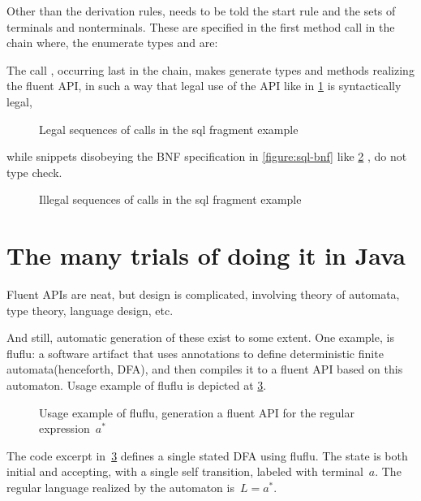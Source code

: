 Other than the derivation rules, \Fajita needs to be told the start rule
  and the sets of terminals and nonterminals.
These are specified in the first method call in the chain where,
  the enumerate types  and  are:

\begin{quote}
\end{quote}

The call , occurring last in the chain, makes \Fajita generate types
and methods realizing the fluent API, in such a way that legal use of the API
like in \cref{figure:sql:legal} is syntactically legal,

\begin{figure}[H]
  \caption{\label{figure:sql:legal}
  Legal sequences of calls in the sql fragment example}

\end{figure}

while snippets disobeying the BNF specification in \cref{figure:sql-bnf} like
\cref{figure:sql:illegal} , do not type check.

\begin{figure}[H]
  \caption{\label{figure:sql:illegal}
  Illegal sequences of calls in the sql fragment example}
\end{figure}

\section{The many trials of doing it in Java}
Fluent APIs are neat, but design is complicated,
involving theory of automata, type theory, language design, etc.

And still, automatic generation of these exist to some extent.
One example, is fluflu: a software artifact that uses
\Java annotations to define deterministic finite automata(henceforth, DFA), and then
compiles it to a fluent API based on this automaton. Usage example of fluflu is
depicted at \cref{figure:fluflu}.

\begin{figure}[ht]
  \caption{\label{figure:fluflu}
    Usage example of fluflu, generation a fluent
  API for the regular expression~\texorpdfstring{$a^*$}{a*}}
\end{figure}
The code excerpt in~\cref{figure:fluflu} defines a single stated DFA using
fluflu. The state is both initial and accepting, with a single self
transition, labeled with terminal~$a$. The regular language realized by the
automaton is~$L=a^*$.

